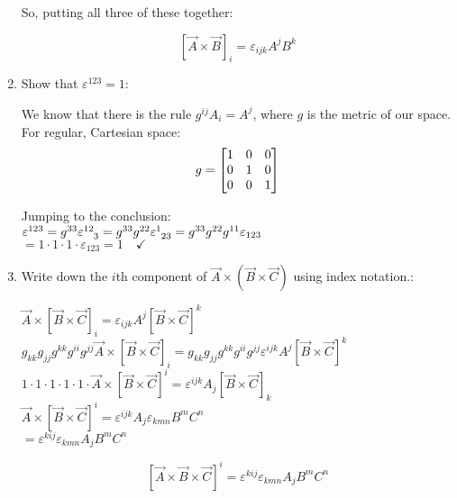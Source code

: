\documentclass[12pt]{article}
\begin{document}
\begin{enumerate}[label=\alph*)]
So, putting all three of these together:

\[\boxed{[\vec{A}\times \vec{B}]_i = \varepsilon_{ijk}A^jB^k}\]

\item Show that $\varepsilon^{123} = 1$:\vspace{0.5em}

We know that there is the rule $g^{ij}A_i = A^j$, where $g$ is the metric of our space. For regular, Cartesian space:
\[g = \mqty[1 & 0 & 0 \\ 0& 1 & 0\\ 0 & 0 & 1]\]

Jumping to the conclusion:\vspace{0.5em}\\
$\varepsilon^{123} = g^{33}\varepsilon^{12}_{\hspace*{0.8em}3} = g^{33}g^{22}\varepsilon^1_{\hspace*{0.4em} 2 3} = g^{33}g^{22}g^{11}\varepsilon_{123}$\vspace{0.5em}\\
\hspace*{1.9em}$= 1 \cdot 1 \cdot 1 \cdot \varepsilon_{123} = 1 \quad \checkmark$

\item Write down the $i$th component of $\vec{A}\times (\vec{B} \times \vec{C})$ using index notation.:\vspace{0.5em}

$\vec{A}\times[\vec{B}\times \vec{C}]_i = \varepsilon_{ijk}A^j [\vec{B}\times \vec{C}]^k$\vspace{0.5em}\\
$g_{kk}g_{jj}g^{kk}g^{ii}g^{jj}\vec{A}\times[\vec{B}\times \vec{C}]_i = g_{kk}g_{jj}g^{kk}g^{ii}g^{jj}\varepsilon^{ijk}A^j [\vec{B}\times \vec{C}]^k$\vspace{0.5em}\\
$1 \cdot 1 \cdot 1 \cdot 1 \cdot 1 \cdot \vec{A}\times[\vec{B}\times \vec{C}]^i=\varepsilon^{ijk}A_j[\vec{B}\times \vec{C}]_k$\vspace{0.5em}\\
$\vec{A}\times[\vec{B}\times \vec{C}]^i =\varepsilon^{ijk}A_j \varepsilon_{kmn}B^m C^n$\vspace{0.5em}\\
\hspace*{6em}$=\varepsilon^{kij}\varepsilon_{kmn}A_jB^m C^n$

\[\boxed{[\vec{A}\times\vec{B}\times \vec{C}]^i = \varepsilon^{kij}\varepsilon_{kmn}A_jB^m C^n}\]


\end{enumerate}
\end{document}
